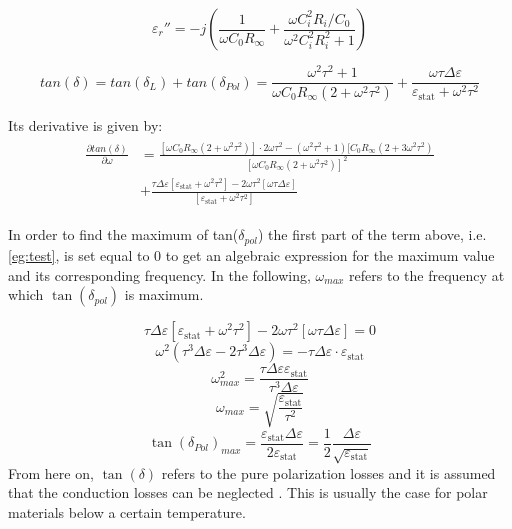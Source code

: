 \begin{equation}
\varepsilon_r'' = -j \left(\frac{1}{\omega C_0 R_\infty}+\frac{\omega C_i^2 R_i / C_0}{\omega^2 C_i^2 R_i^2 +1} \right)
\end{equation}

\begin{equation}
tan(\delta) = tan(\delta_L) + tan( \delta_{Pol}) = \frac{\omega^2 \tau^2+1}{\omega C_0 R_\infty (2+ \omega^2 \tau^2)}+\frac{\omega \tau \Delta \varepsilon}{\varepsilon_{\textrm{stat}} + \omega^2 \tau^2}
\end{equation}

Its derivative is given by: 
\begin{align}
\begin{split}
\frac{\partial tan(\delta)}{ \partial \omega} & = \frac{[\omega C_0 R_\infty (2+\omega^2 \tau^2)]\cdot 2 \omega \tau^2 - (\omega^2 \tau^2 +1) [C_0 R_\infty (2+3 \omega^2 \tau^2)  }{[\omega C_0 R_\infty (2+\omega^2 \tau^2)]^2}\\
					      & + \frac{\tau \Delta \varepsilon [\varepsilon_{\textrm{stat}} + \omega^2 \tau^2] - 2 \omega \tau^2 [\omega \tau \Delta \varepsilon]}{[\varepsilon_{\textrm{stat}} +\omega^2 \tau^2]}
\label{eg:test}
\end{split}
\end{align}
					      
In order to find the maximum of tan($\delta_{pol}$) the first part of the term above, i.e. \eqref{eg:test}, is set equal to 0 to get an algebraic expression for the maximum value and its corresponding frequency. In the following, $\omega_{max}$ refers to the frequency at which $\tan(\delta_{pol})$ is maximum.

\begin{equation}
\tau \Delta \varepsilon [\varepsilon_{\textrm{stat}} + \omega^2 \tau^2] -2\omega \tau^2 [\omega \tau \Delta \varepsilon] = 0
\end{equation}
\begin{equation}
\omega^2 (\tau^3 \Delta \varepsilon -2 \tau^3 \Delta \varepsilon) = - \tau \Delta \varepsilon \cdot \varepsilon_{\textrm{stat}}
\end{equation}
\begin{equation}
\omega_{max}^2 = \frac{\tau \Delta \varepsilon \varepsilon_{\textrm{stat}}}{\tau^3 \Delta \varepsilon}
\end{equation}
\begin{equation}
\omega_{max} = \sqrt{\frac{\varepsilon_{\textrm{stat}}}{\tau^2}}
\end{equation}
\begin{equation}
\tan(\delta_{Pol})_{max} = \frac{\varepsilon_{\textrm{stat}} \Delta\varepsilon}{2\varepsilon_{\textrm{stat}}} = \frac{1}{2} \frac{\Delta \varepsilon}{\sqrt{\varepsilon_{\textrm{stat}}}}
\end{equation}
From here on, $\tan(\delta)$ refers to the pure polarization losses and it is assumed that the conduction losses can be neglected . This is usually the case for polar materials below a certain temperature. 

